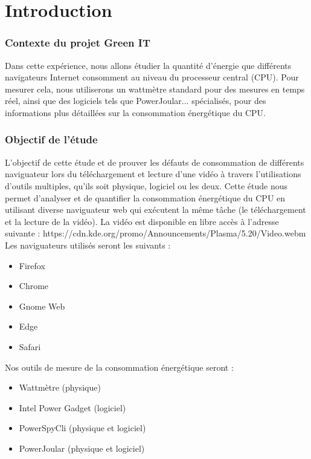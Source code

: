 \documentclass[12pt, a4paper]{report}
\begin{document}
\newpage
\listoffigures

\newpage

\tableofcontents

\newpage

\chapter{\centering Introduction}

\subsection{Contexte du projet Green IT}

Dans cette expérience, nous allons étudier la quantité d'énergie que différents navigateurs Internet consomment au niveau du processeur central (CPU). Pour mesurer cela, nous utiliserons un wattmètre standard pour des mesures en temps réel, ainsi que des logiciels tels que PowerJoular... spécialisés, pour des informations plus détaillées sur la consommation énergétique du CPU.

\subsection{Objectif de l'étude}
L'objectif de cette étude et de prouver les défauts de consommation de différents naviguateur lors du téléchargement et lecture d'une vidéo à travers l'utilisations d'outils multiples, qu'ils soit physique, logiciel ou les deux.
Cette étude nous permet d'analyser et de quantifier la consommation énergétique du CPU en utilisant diverse naviguateur web qui exécutent la même tâche (le téléchargement et la lecture de la vidéo).
La vidéo est disponible en libre accès à l'adresse suivante : https://cdn.kde.org/promo/Announcements/Plasma/5.20/Video.webm
Les naviguateurs utilisés seront les suivants : 
\begin{itemize}
    \item Firefox
    \item Chrome
    \item Gnome Web
    \item Edge
    \item Safari
\end{itemize}
Nos outils de mesure de la consommation énergétique seront :
\begin{itemize}
    \item Wattmètre (physique)
    \item Intel Power Gadget (logiciel)
    \item PowerSpyCli (physique et logiciel)
    \item PowerJoular (physique et logiciel)
\end{itemize}
\end{document}
